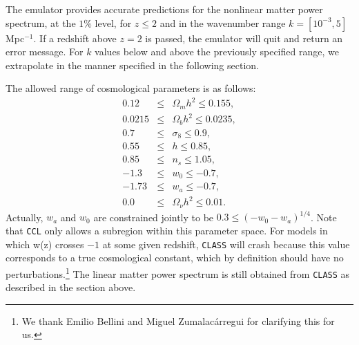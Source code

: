 \documentclass[\docopts]{\docclass}
\newcommand{\ccl}{{\tt CCL}\xspace}
\begin{document}
The emulator provides accurate predictions for the nonlinear matter power spectrum, at the $1\%$ level, for $z\leq 2$ and in the wavenumber range $k=[10^{-3},5]$ Mpc$^{-1}$. If a redshift above $z=2$ is passed, the emulator will quit and return an error message. For $k$ values below and above the previously specified range, we extrapolate in the manner specified in the following section.

The allowed range of cosmological parameters is as follows:
\begin{eqnarray}
0.12&\leq& \Omega_m h^2 \leq 0.155,\nonumber\\
0.0215&\leq& \Omega_b h^2 \leq 0.0235,\nonumber\\
0.7&\leq& \sigma_8 \leq 0.9,\nonumber\\
0.55&\leq& h \leq 0.85,\nonumber\\
0.85&\leq& n_s\leq 1.05,\nonumber\\
-1.3&\leq& w_0\leq-0.7,\nonumber\\
-1.73&\leq& w_a\leq -0.7,\nonumber\\
0.0&\leq& \Omega_\nu h^2 \leq 0.01.
\end{eqnarray}
Actually, $w_a$ and $w_0$ are constrained jointly to be $0.3\leq (-w_0-w_a)^{1/4}$. Note that \ccl only allows a subregion within this parameter space. For models in which w(z) crosses $-1$ at some given redshift, {\tt CLASS} will crash because this value corresponds to a true cosmological constant, which by definition should have no perturbations.\footnote{We thank Emilio Bellini and Miguel Zumalac\'arregui for clarifying this for us.} The linear matter power spectrum is still obtained from {\tt CLASS} as described in the section above.
\end{document}
